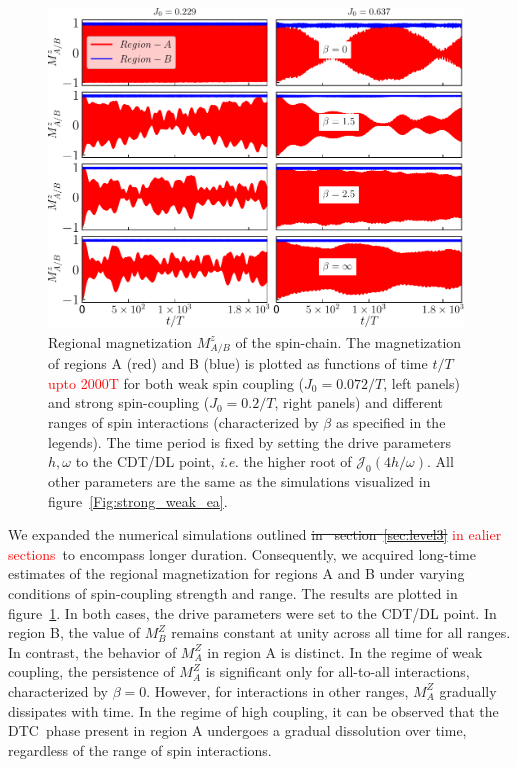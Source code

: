 \documentclass[12pt]{iopart}
\newcommand{\red}[1]{\textcolor{red}{#1}}
\begin{document}
\begin{figure}[t]
	\centering
	\hspace{1.5cm}\includegraphics[width = 11cm]{figure9.pdf}
	\caption{Regional magnetization $M^z_{A/B}$ of the spin-chain. The magnetization of regions A (red) and B (blue) is plotted as functions of time $t/T$ \red{upto 2000T} for both weak spin coupling ($J_0=0.072/T$, left panels) and strong spin-coupling ($J_0=0.2/T$, right panels) and different ranges of spin interactions (characterized by $\beta$ as specified in the legends). The time period is fixed by setting the drive parameters $h,\omega$ to the CDT/DL point, \textit{i.e.} the higher root of $\mathcal{J}_0(4h/\omega)$. All other parameters are the same as the simulations visualized in figure~\ref{Fig:strong_weak_ea}.}
	\label{Fig:regiogionalmag}
\end{figure}
We expanded the numerical simulations outlined \sout{in  section~\ref{sec:level3}} \red{in ealier sections} to encompass longer duration. Consequently, we acquired long-time estimates of the regional magnetization for regions A and B under varying conditions of spin-coupling strength and range. The results are plotted in figure~\ref{Fig:regiogionalmag}. In both cases, the drive parameters were set to the CDT/DL point. In region B, the value of $M^Z_B$ remains constant at unity across all time for all ranges. In contrast, the behavior of $M^Z_A$ in region A is distinct. In the regime of weak coupling, the persistence of $M^Z_A$ is significant only for all-to-all interactions, characterized by $\beta=0$. However, for interactions in other ranges, $M^Z_A$ gradually dissipates with time. In the regime of high coupling, it can be observed that the DTC phase present in region A undergoes a gradual dissolution over time, regardless of the range of spin interactions. 
\end{document}
